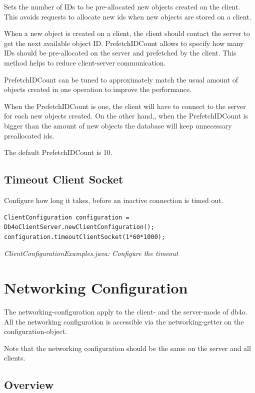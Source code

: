 Sets the number of IDs to be pre-allocated new objects created on the client. This avoids requests to allocate new ids when new objects are stored on a client.

When a new object is created on a client, the client should contact the server to get the next available object ID. PrefetchIDCount allows to specify how many IDs should be pre-allocated on the server and prefetched by the client. This method helps to reduce client-server communication.

PrefetchIDCount can be tuned to approximately match the usual amount of objects created in one operation to improve the performance.

When the PrefetchIDCount is one, the client will have to connect to the server for each new objects created. On the other hand,, when the PrefetchIDCount is bigger than the amount of new objects the database will keep unnecessary preallocated ids.

The default PrefetchIDCount is 10.

\subsection{Timeout Client Socket}
\label{ref:configuration-client-timeout-client-socket}

Configure how long it takes, before an inactive connection is timed out.

\begin{lstlisting}
ClientConfiguration configuration = Db4oClientServer.newClientConfiguration();
configuration.timeoutClientSocket(1*60*1000);
\end{lstlisting}

{\small\itshape ClientConfigurationExamples.java: Configure the timeout\par}
\medskip

\section{Networking Configuration}
\label{ref:configuration-network-configuration}

The networking-configuration apply to the client- and the server-mode of db4o. All the networking configuration is accessible via the networking-getter on the configuration-object.

Note that the networking configuration should be the same on the server and all clients.

\subsection*{Overview}

